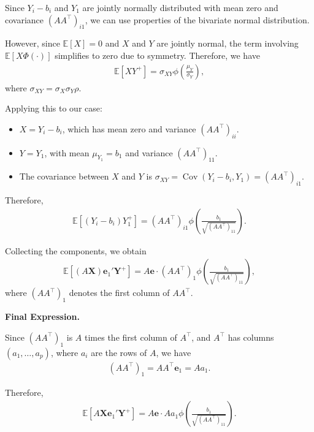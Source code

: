 \documentclass[10pt,a4paper,reqno]{amsart}
\theoremstyle{example}
\begin{document}
Since \(Y_i - b_i\) and \(Y_1\) are jointly normally distributed with mean zero and covariance \((AA^\intercal)_{i1}\), we can use properties of the bivariate normal distribution.

However, since \(\mathbb{E}[X] = 0\) and \(X\) and \(Y\) are jointly normal, the
term involving \(\mathbb{E}[ X \Phi(\cdot) ]\) simplifies to zero due to
symmetry. Therefore, we have 
\begin{align*}
\mathbb{E}[ X Y^+ ] = \sigma_{XY} \phi\left( \frac{\mu_Y}{\sigma_Y} \right),
\end{align*}
where \(\sigma_{XY} = \sigma_X \sigma_Y \rho\).

Applying this to our case:
\begin{itemize}
    \item \(X = Y_i - b_i\), which has mean zero and variance \((AA^\intercal)_{ii}\).
    \item \(Y = Y_1\), with mean \(\mu_{Y_1} = b_1\) and variance \((AA^\intercal)_{11}\).
    \item The covariance between \(X\) and \(Y\) is \(\sigma_{XY} = \operatorname{Cov}(Y_i - b_i, Y_1) = (AA^\intercal)_{i1}\).
\end{itemize}

Therefore,
\begin{align*}
\mathbb{E}\left[ (Y_i - b_i) Y_1^+ \right] = (AA^\intercal)_{i1} \phi\left( \frac{b_1}{\sqrt{(AA^\intercal)_{11}}} \right).
\end{align*}

Collecting the components, we obtain
\begin{align*}
\mathbb{E}\left[ (A \mathbf{X}) \mathbf{e}_1' \mathbf{Y}^+ \right] = A \mathbf{e} \cdot (AA^\intercal)_{1} \phi\left( \frac{b_1}{\sqrt{(AA^\intercal)_{11}}} \right),
\end{align*}
where \((AA^\intercal)_{1}\) denotes the first column of \(AA^\intercal\).

\textbf{Final Expression.}

Since \((AA^\intercal)_{1}\) is \(A\) times the first column of \(A^\intercal\), and \(A^\intercal\) has columns \((a_{1}, \dots, a_{p})\), where \(a_{i}\) are the rows of \(A\), we have
\begin{align*}
(AA^\intercal)_{1} = A A^\intercal \mathbf{e}_1 = A a_{1}.
\end{align*}

Therefore,
\begin{align*}
\mathbb{E}\left[ A \mathbf{X} \mathbf{e}_1' \mathbf{Y}^+ \right] = A \mathbf{e} \cdot A a_{1} \phi\left( \frac{b_1}{\sqrt{(AA^\intercal)_{11}}} \right).
\end{align*}
\end{document}
